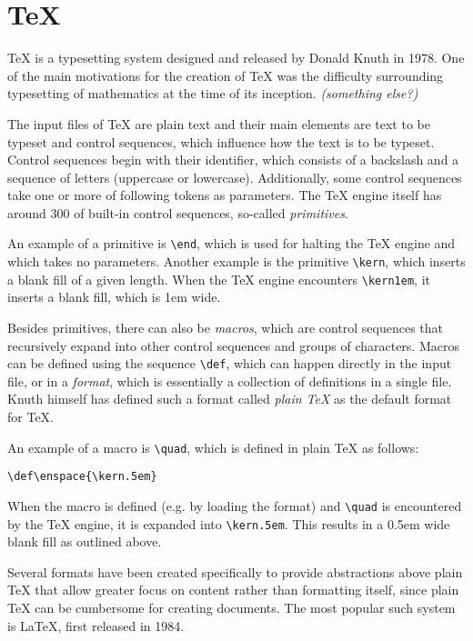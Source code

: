 \documentclass[
  digital,     %
  oneside,     %
  nosansbold,  %
  nocolorbold, %
  lof,         %
  lot,         %
]{fithesis4}
\newcommand{\macro}[1]{\texttt{\textbackslash{}{#1}}}
\begin{document}
\section{\TeX{}}
\TeX{} is a typesetting system designed and released by Donald Knuth in 1978. One of the main motivations for the creation of \TeX{} was the difficulty surrounding typesetting of mathematics at the time of its inception. \textit{(something else?)}

The input files of \TeX{} are plain text and their main elements are text to be typeset and control sequences, which influence how the text is to be typeset. 
Control sequences begin with their identifier, which consists of a backslash and a sequence of letters (uppercase or lowercase). Additionally, some control sequences take one or more of following tokens as parameters. The \TeX{} engine itself has around 300 of built-in control sequences, so-called \textit{primitives}.

An example of a primitive is \macro{end}, which is used for halting the \TeX{} engine and which takes no parameters. Another example is the primitive \macro{kern}, which inserts a blank fill of a given length. When the \TeX{} engine encounters \texttt{\textbackslash{}kern1em}, it inserts a blank fill, which is 1em wide.

Besides primitives, there can also be \textit{macros}, which are control sequences that recursively expand into other control sequences and groups of characters. Macros can be defined using the sequence \macro{def}, which can happen directly in the input file, or in a \textit{format}, which is essentially a collection of definitions in a single file. Knuth himself has defined such a format called \textit{plain \TeX{}} as the default format for \TeX{}.

An example of a macro is \macro{quad}, which is defined in plain \TeX{} as follows:

\noindent
\begin{lstlisting}
\def\enspace{\kern.5em}
\end{lstlisting}

When the macro is defined (e.g. by loading the format) and \macro{quad} is encountered by the \TeX{} engine, it is expanded into \texttt{\textbackslash{}kern.5em}. This results in a 0.5em wide blank fill as outlined above.

Several formats have been created specifically to provide abstractions above plain \TeX{} that allow greater focus on content rather than formatting itself, since plain \TeX{} can be cumbersome for creating documents. The most popular such system is \LaTeX{}, first released in 1984.
\end{document}
